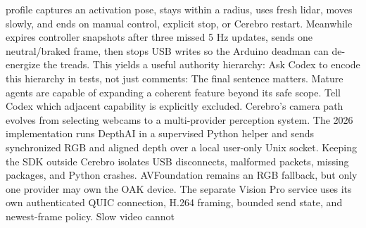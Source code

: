 {} profile captures an activation pose, stays within a radius, uses\markdownRendererSoftLineBreak
{}fresh lidar, moves slowly, and ends on manual control, explicit stop, or\markdownRendererSoftLineBreak
{}Cerebro restart. Meanwhile  expires controller snapshots after\markdownRendererSoftLineBreak
{}three missed 5 Hz updates, sends one neutral/braked frame, then stops USB\markdownRendererSoftLineBreak
{}writes so the Arduino deadman can de-energize the treads.\markdownRendererParagraphSeparator
{}This yields a useful authority hierarchy:\markdownRendererInterblockSeparator
{}\markdownRendererInterblockSeparator
{}Ask Codex to encode this hierarchy in tests, not just comments:\markdownRendererInterblockSeparator
{}\markdownRendererInterblockSeparator
{}The final sentence matters. Mature agents are capable of expanding a coherent\markdownRendererSoftLineBreak
{}feature beyond its safe scope. Tell Codex which adjacent capability is\markdownRendererSoftLineBreak
{}explicitly excluded.\markdownRendererInterblockSeparator
{}\markdownRendererThematicBreak{}\markdownRendererInterblockSeparator
{}
\markdownRendererSectionEnd \markdownRendererSectionBegin
{}\markdownRendererInterblockSeparator
{}Cerebro's camera path evolves from selecting webcams to a multi-provider\markdownRendererSoftLineBreak
{}perception system.\markdownRendererParagraphSeparator
{}The 2026 implementation runs DepthAI in a supervised Python helper and sends\markdownRendererSoftLineBreak
{}synchronized RGB and aligned depth over a local user-only Unix socket. Keeping\markdownRendererSoftLineBreak
{}the SDK outside Cerebro isolates USB disconnects, malformed packets, missing\markdownRendererSoftLineBreak
{}packages, and Python crashes. AVFoundation remains an RGB fallback, but only\markdownRendererSoftLineBreak
{}one provider may own the OAK device.\markdownRendererParagraphSeparator
{}The separate Vision Pro service uses its own authenticated QUIC connection,\markdownRendererSoftLineBreak
{}H.264 framing, bounded send state, and newest-frame policy. Slow video cannot\markdownRendererSoftLineBreak
